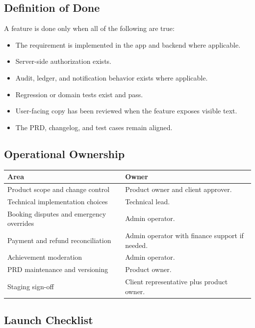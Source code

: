 \documentclass[11pt,a4paper]{article}
\begin{document}
\subsection{Definition of Done}

A feature is done only when all of the following are true:

\begin{itemize}
    \item The requirement is implemented in the app and backend where applicable.
    \item Server-side authorization exists.
    \item Audit, ledger, and notification behavior exists where applicable.
    \item Regression or domain tests exist and pass.
    \item User-facing copy has been reviewed when the feature exposes visible text.
    \item The PRD, changelog, and test cases remain aligned.
\end{itemize}

\subsection{Operational Ownership}

\begin{tabular}{|p{5.0cm}|p{9.2cm}|}
\hline
\textbf{Area} & \textbf{Owner} \\
\hline
Product scope and change control & Product owner and client approver. \\
\hline
Technical implementation choices & Technical lead. \\
\hline
Booking disputes and emergency overrides & Admin operator. \\
\hline
Payment and refund reconciliation & Admin operator with finance support if needed. \\
\hline
Achievement moderation & Admin operator. \\
\hline
PRD maintenance and versioning & Product owner. \\
\hline
Staging sign-off & Client representative plus product owner. \\
\hline
\end{tabular}

\subsection{Launch Checklist}
\end{document}
